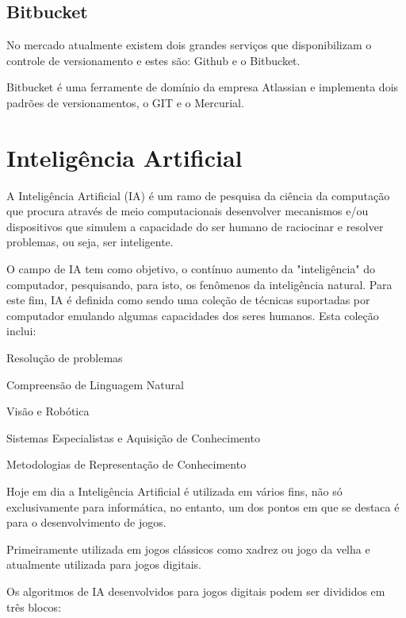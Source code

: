 	\subsection{Bitbucket}
	
No mercado atualmente existem dois grandes serviços que disponibilizam o controle de versionamento e estes são: Github e o Bitbucket.

Bitbucket é uma ferramente de domínio da empresa Atlassian e implementa dois padrões de versionamentos, o GIT e o Mercurial. \cite{bit}

\section{Inteligência Artificial}
\label{sec:inteligencia-artificial}

A Inteligência Artificial (IA) é um ramo de pesquisa da ciência da computação que procura através de meio computacionais desenvolver mecanismos e/ou dispositivos que simulem a capacidade do ser humano de raciocinar e resolver problemas, ou seja, ser inteligente. 

O campo de IA tem como objetivo, o contínuo aumento da "inteligência" do computador, pesquisando, para isto, os fenômenos da inteligência natural. Para este fim, IA é definida  como sendo uma coleção de técnicas suportadas por computador emulando algumas capacidades dos seres humanos. Esta coleção inclui:

\begin{alineascomponto}
	
   \item Resolução de problemas
   \item Compreensão de Linguagem Natural
   \item Visão e Robótica
   \item Sistemas Especialistas e Aquisição de Conhecimento
   \item Metodologias de Representação de Conhecimento

	\end{alineascomponto}
	
Hoje em dia a Inteligência Artificial é utilizada em vários fins, não só exclusivamente para informática, no entanto, um dos pontos em que se destaca é para o desenvolvimento de jogos. 

Primeiramente utilizada em jogos clássicos como xadrez ou jogo da velha e atualmente utilizada para jogos digitais.

Os algoritmos de IA desenvolvidos para jogos digitais podem ser divididos em três blocos:

